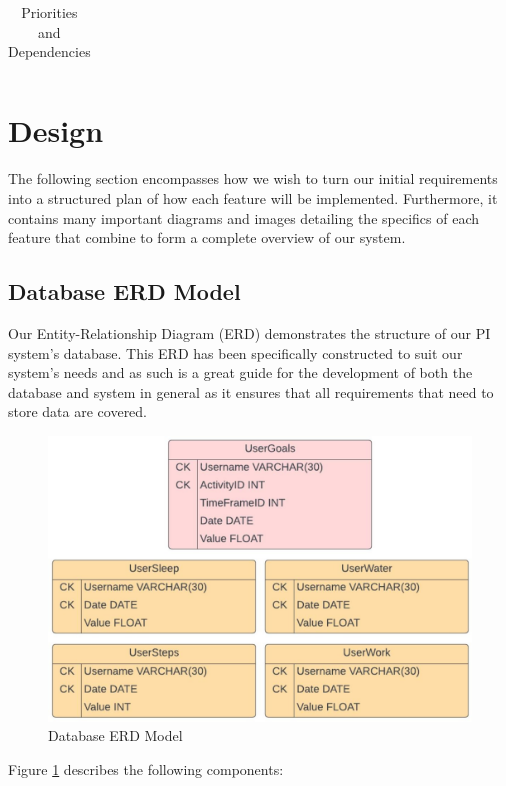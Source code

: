 \documentclass[11pt]{article}
\begin{document}
\begin{table}[!ht]
\begin{center}
\begin{tabular}{|l|c|c|c|}
\end{tabular}
\caption{Priorities and Dependencies}
\label{tab:reqTable}
\end{center}
\end{table}


\section{Design}

The following section encompasses how we wish to turn our initial requirements 
into a structured plan of how each feature will be implemented. Furthermore, 
it contains many important diagrams and images detailing the specifics of each 
feature that combine to form a complete overview of our system.\par

\subsection{Database ERD Model}

Our Entity-Relationship Diagram (ERD) demonstrates the structure of 
our PI system's database. This ERD has been specifically constructed
to suit our system's needs and as such is a great guide for the development 
of both the database and system in general as it ensures that all requirements
that need to store data are covered.\par

\begin{figure}[!ht]
  \centering
  \includegraphics[width = 0.7\linewidth]{PI Systems Database}
  \caption{Database ERD Model}
  \label{fig:PI_ERD}
\end{figure}

\newpage

Figure \ref{fig:PI_ERD} describes the following components:
\end{document}

